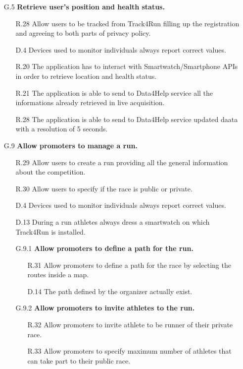 \begin{enumerate}
	\begin{enumerate}
	\item [G.5] \textbf{Retrieve user's position and health status.}
		\begin{enumerate}
		\item [R.28] Allow users to be tracked from Track4Run filling up the registration and agreeing to both parts of privacy policy.
		\item [D.4] Devices used to monitor individuals always report correct values.
		\item [R.20] The application has to interact with Smartwatch/Smartphone APIs in order to retrieve location and health status.
		\item [R.21] The application is able to send to Data4Help service all the informations already retrieved in live acquisition.
		\item [R.28] The application is able to send to Data4Help service updated daata with a resolution of 5 seconds.
		\end{enumerate}
		
	\item [G.9] \textbf{Allow promoters to manage a run.}
		\begin{enumerate}
		\item [R.29] Allow users to create a run providing all the general information about the competition.
		\item [R.30] Allow users to specify if the race is public or private.
		\item [D.4] Devices used to monitor individuals always report correct values.
		\item [D.13] During a run athletes always dress a smartwatch on which Track4Run is installed.
			
		\item [G.9.1] \textbf{Allow promoters to define a path for the run.}
			\begin{enumerate}
			\item [R.31] Allow promoters to define a path for the race by selecting the routes inside a map.
			\item [D.14] The path defined by the organizer actually exist.
			\end{enumerate}
			
		\item [G.9.2] \textbf{Allow promoters to invite athletes to the run.}
			\begin{enumerate}
			\item [R.32] Allow promoters to invite athlete to be runner of their private race.
			\item [R.33] Allow promoters to specify maximum number of athletes that can take part to their public race.
			\end{enumerate}
	\end{enumerate}
	

\end{enumerate}
\end{enumerate}
